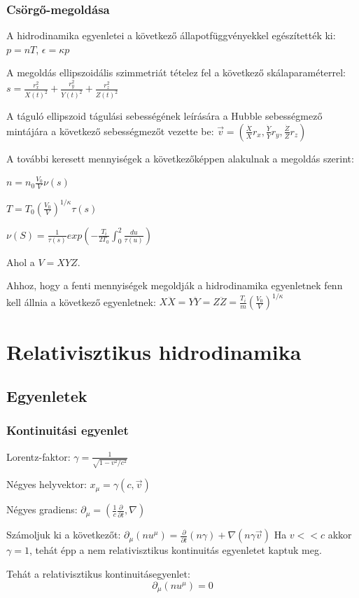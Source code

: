 \documentclass{beamer}
\begin{document}
\begin{frame}
\frametitle{Csörgő-megoldása}
A hidrodinamika egyenletei a következő állapotfüggvényekkel egészítették ki: $p=nT$, $\epsilon=\kappa p$

A megoldás ellipszoidális szimmetriát tételez fel a következő skálaparaméterrel:
$s=\frac{r_x^2}{X(t)^2}+\frac{r_y^2}{Y(t)^2}+\frac{r_z^2}{Z(t)^2}$

A táguló ellipszoid tágulási sebességének leírására  a Hubble sebességmező mintájára a következő sebességmezőt vezette be:
$\vec{v}=(\frac{\dot{X}}{X}r_x, \frac{\dot{Y}}{Y}r_y, \frac{\dot{Z}}{Z}r_z)$

A további keresett mennyiségek a következőképpen alakulnak a megoldás szerint:

$n=n_0\frac{V_0}{V}\nu(s)$

$T=T_0(\frac{V_0}{V})^{1/\kappa}\tau(s)$

$\nu(S)=\frac{1}{\tau(s)}exp(-\frac{T_i}{2T_0}\int_0^2 \frac{du}{\tau(u)})$


Ahol a $V=XYZ$.

Ahhoz, hogy a fenti mennyiségek megoldják a hidrodinamika egyenletnek fenn kell állnia a következő egyenletnek: $X\ddot{X}=Y\ddot{Y}=Z\ddot{Z}=\frac{T_i}{m}(\frac{V_0}{V})^{1/\kappa}$

\end{frame}



\section{Relativisztikus hidrodinamika}

\subsection{Egyenletek}

\begin{frame}
\frametitle{Kontinuitási egyenlet}
Lorentz-faktor: $\gamma=\frac{1}{\sqrt{1-v^2/c^2}}$

Négyes helyvektor: $x_{\mu}=\gamma (c,\vec{v})$

Négyes gradiens: $\partial_{\mu}=(\frac{1}{c}\frac{\partial}{\partial t}, \nabla)$

Számoljuk ki a következőt: $\partial_{\mu}(nu^{\mu})=\frac{\partial}{\partial t}(n\gamma)+\nabla(n\gamma \vec{v})$
Ha $v<<c$ akkor $\gamma=1$, tehát épp a nem relativisztikus kontinuitás egyenletet kaptuk meg.

Tehát a relativisztikus kontinuitásegyenlet: 
\begin{equation*}
\partial_{\mu}(nu^{\mu})=0
\end{equation*}
\end{frame}
\end{document}
